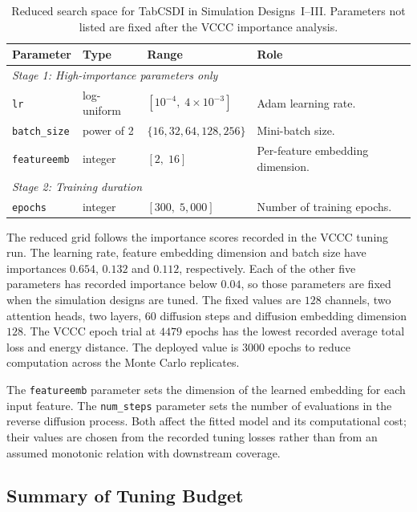 \begin{table}[ht]
\centering
\caption{Reduced search space for TabCSDI in Simulation Designs~I--III. Parameters not listed are fixed after the VCCC importance analysis.}
\label{tab:tune_tabcsdi_reduced}
\begin{tabularx}{\textwidth}{lll>{\raggedright\arraybackslash}X}
\toprule
Parameter & Type & Range & Role \\
\midrule
\multicolumn{4}{l}{\textit{Stage 1: High-importance parameters only}} \\
\texttt{lr} & log-uniform & $[10^{-4},\; 4 \times 10^{-3}]$ &
    Adam learning rate. \\
\texttt{batch\_size} & power of 2 & $\{16, 32, 64, 128, 256\}$ &
    Mini-batch size. \\
\texttt{featureemb} & integer & $[2,\; 16]$ &
    Per-feature embedding dimension. \\
\midrule
\multicolumn{4}{l}{\textit{Stage 2: Training duration}} \\
\texttt{epochs} & integer & $[300,\; 5{,}000]$ &
    Number of training epochs. \\
\bottomrule
\end{tabularx}
\end{table}

The reduced grid follows the importance scores recorded in the VCCC tuning run. The learning rate, feature embedding dimension and batch size have importances $0.654$, $0.132$ and $0.112$, respectively. Each of the other five parameters has recorded importance below $0.04$, so those parameters are fixed when the simulation designs are tuned. The fixed values are $128$ channels, two attention heads, two layers, $60$ diffusion steps and diffusion embedding dimension $128$. The VCCC epoch trial at $4479$ epochs has the lowest recorded average total loss and energy distance. The deployed value is $3000$ epochs to reduce computation across the Monte Carlo replicates.

The \texttt{featureemb} parameter sets the dimension of the learned embedding for each input feature. The \texttt{num\_steps} parameter sets the number of evaluations in the reverse diffusion process. Both affect the fitted model and its computational cost; their values are chosen from the recorded tuning losses rather than from an assumed monotonic relation with downstream coverage.

\subsection{Summary of Tuning Budget}

